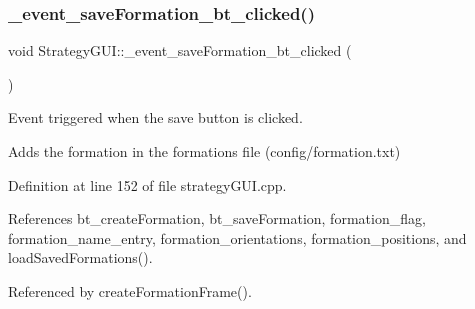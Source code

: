 \subsubsection{\texorpdfstring{\+\_\+event\+\_\+save\+Formation\+\_\+bt\+\_\+clicked()}{\_event\_saveFormation\_bt\_clicked()}}
{\footnotesize\ttfamily void Strategy\+G\+U\+I\+::\+\_\+event\+\_\+save\+Formation\+\_\+bt\+\_\+clicked (\begin{DoxyParamCaption}{ }\end{DoxyParamCaption})\hspace{0.3cm}{\ttfamily [private]}}



Event triggered when the save button is clicked. 

Adds the formation in the formations file (config/formation.\+txt) 

Definition at line 152 of file strategy\+G\+U\+I.\+cpp.



References bt\+\_\+create\+Formation, bt\+\_\+save\+Formation, formation\+\_\+flag, formation\+\_\+name\+\_\+entry, formation\+\_\+orientations, formation\+\_\+positions, and load\+Saved\+Formations().



Referenced by create\+Formation\+Frame().


